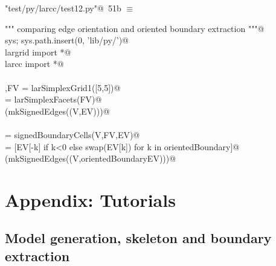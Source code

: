 \documentclass[11pt,oneside]{article}    %
\begin{document}
\begin{flushleft} \small \label{scrap84}
\protect{}\verb@"test/py/larcc/test12.py"@\nobreak\ {\footnotesize 51b }$\equiv$
\vspace{-1ex}
\begin{list}{}{} \item
\mbox{}\verb@""" comparing edge orientation and oriented boundary extraction """@\\
\mbox{}\verb@import sys; sys.path.insert(0, 'lib/py/')@\\
\mbox{}\verb@from largrid import *@\\
\mbox{}\verb@from larcc import *@\\
\mbox{}\verb@@\\
\mbox{}\verb@V,FV = larSimplexGrid1([5,5])@\\
\mbox{}\verb@EV = larSimplexFacets(FV)@\\
\mbox{}\verb@VIEW(mkSignedEdges((V,EV)))@\\
\mbox{}\verb@@\\
\mbox{}\verb@orientedBoundary = signedBoundaryCells(V,FV,EV)@\\
\mbox{}\verb@orientedBoundaryEV = [EV[-k] if k<0 else swap(EV[k]) for k in orientedBoundary]@\\
\mbox{}\verb@VIEW(mkSignedEdges((V,orientedBoundaryEV)))@\\
\mbox{}\verb@@{\NWsep}
\end{list}
\vspace{-2ex}
\end{flushleft}



\appendix

\section{Appendix: Tutorials}


\subsection{Model generation, skeleton and boundary extraction}
\end{document}
